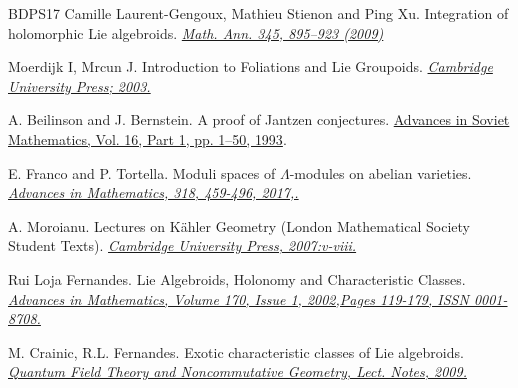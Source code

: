\documentclass[12pt,reqno]{amsart}
\numberwithin{equation}{subsection}
\theoremstyle{definition}
\theoremstyle{theorem}
\begin{document}
\begin{thebibliography}{BDPS17}
	\newblock Camille Laurent-Gengoux, Mathieu Stienon and Ping Xu.
	\newblock Integration of holomorphic Lie algebroids.
	\newblock \href{https://link.springer.com/article/10.1007/s00208-009-0388-7}{\em Math. Ann. 345, 895–923 (2009)}
	
	\newblock Moerdijk I, Mrcun J.
	\newblock Introduction to Foliations and Lie Groupoids.
	\newblock \href{https://www.cambridge.org/core/books/introduction-to-foliations-and-lie-groupoids/75BBFED277FF39A56594731202789016}{\em Cambridge University Press; 2003.}
	
	\newblock A. Beilinson and J. Bernstein.
	\newblock A proof of Jantzen conjectures.
	\newblock \href{https://www.math.tau.ac.il/~bernstei/Publication_list/publication_texts/Ber-Beil_ProofJatzenConj.pdf}{Advances in Soviet Mathematics, Vol. 16, Part 1, pp. 1–50, 1993}.
	
	\newblock E. Franco and P. Tortella.
	\newblock  Moduli spaces of \(\Lambda \)-modules on abelian varieties.
	\newblock \href{https://www.sciencedirect.com/science/article/pii/S0001870816305849}{\em Advances in Mathematics, 318, 459-496, 2017,.}
	
	
	\newblock A. Moroianu.
	\newblock  Lectures on Kähler Geometry (London Mathematical Society Student Texts).
	\newblock \href{https://www.cambridge.org/core/books/abs/lectures-on-kahler-geometry/contents/823EB6F94327152106F30C3046D6DBF4}{\em Cambridge University Press, 2007:v-viii.}
	
	\newblock Rui Loja Fernandes.
	\newblock Lie Algebroids, Holonomy and Characteristic Classes.
	\newblock \href{https://www.sciencedirect.com/science/article/pii/S0001870801920705}{\em Advances in Mathematics,
	Volume 170, Issue 1,
	2002,Pages 119-179, ISSN 0001-8708.}
		
	\newblock M. Crainic, R.L. Fernandes.
	\newblock Exotic characteristic classes of Lie algebroids.
	\newblock \href{https://www.math.tecnico.ulisboa.pt/~rfern/Meus-papers/HTML/jets.pdf}{\em Quantum Field Theory and Noncommutative Geometry, Lect. Notes, 2009.}
	

\end{thebibliography}
\end{document}
